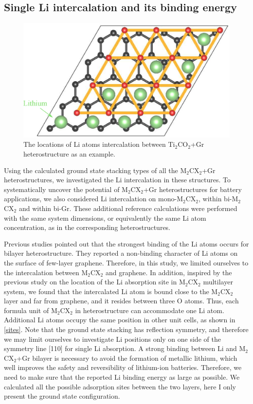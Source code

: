 \subsection{Single Li intercalation and its binding energy}

\begin{figure}[htb]
\centering
\includegraphics[width=0.8\linewidth]{sites.eps}%
\caption{The locations of Li atoms intercalation between Ti$_2$CO$_2$+Gr heterostructure as an example.  \label{sites}}
\end{figure}

Using the calculated ground state stacking types of all the M$_2$CX$_2$+Gr heterostructures, we investigated the Li intercalation in these structures. To systematically uncover the potential of M$_2$CX$_2$+Gr heterostructures for battery applications, we also considered Li intercalation on mono-M$_2$CX$_2$, within bi-M$_2$CX$_2$ and within bi-Gr. These additional reference calculations were performed with the same system dimensions, or equivalently the same Li atom concentration, as in the corresponding heterostructures.

Previous studies\cite{Guo2015,Samad2016,Lee2012} pointed out that the strongest binding of the Li atoms occurs for bilayer heterostructure. They reported a non-binding character of Li atoms on the surface of few-layer graphene. Therefore, in this study, we limited ourselves to the intercalation between M$_2$CX$_2$ and graphene. In addition, inspired by the previous study\cite{doi:10.1063/1.4939745} on the location of the Li absorption site in M$_2$CX$_2$ multilayer system, we found that the intercalated Li atom is bound close to the M$_2$CX$_2$ layer and far from graphene, and it resides between three O atoms. Thus, each formula unit of M$_2$CX$_2$ in heterostructure can accommodate one Li atom.  Additional Li atoms occupy the same position in other unit cells, as shown in \autoref{sites}. Note that the ground state stacking has reflection symmetry, and therefore we may limit ourselves to investigate Li positions only on one side of the symmetry line [110] for  single Li absorption.  A strong binding between Li and M$_2$CX$_2$+Gr bilayer is necessary to avoid the formation of metallic lithium, which well improves the safety and reversibility of lithium-ion batteries. Therefore, we need to make sure that the reported Li binding energy as large as possible. We calculated all the possible adsorption sites between the two layers, here I only present the ground state configuration.

